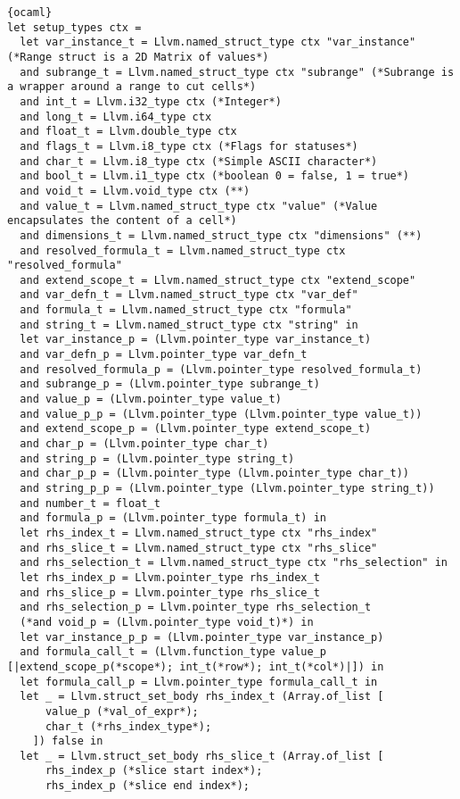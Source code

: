 \begin{lstlisting}{ocaml}
let setup_types ctx =
  let var_instance_t = Llvm.named_struct_type ctx "var_instance" (*Range struct is a 2D Matrix of values*)
  and subrange_t = Llvm.named_struct_type ctx "subrange" (*Subrange is a wrapper around a range to cut cells*)
  and int_t = Llvm.i32_type ctx (*Integer*)
  and long_t = Llvm.i64_type ctx
  and float_t = Llvm.double_type ctx
  and flags_t = Llvm.i8_type ctx (*Flags for statuses*)
  and char_t = Llvm.i8_type ctx (*Simple ASCII character*)
  and bool_t = Llvm.i1_type ctx (*boolean 0 = false, 1 = true*)
  and void_t = Llvm.void_type ctx (**)
  and value_t = Llvm.named_struct_type ctx "value" (*Value encapsulates the content of a cell*)
  and dimensions_t = Llvm.named_struct_type ctx "dimensions" (**)
  and resolved_formula_t = Llvm.named_struct_type ctx "resolved_formula"
  and extend_scope_t = Llvm.named_struct_type ctx "extend_scope"
  and var_defn_t = Llvm.named_struct_type ctx "var_def"
  and formula_t = Llvm.named_struct_type ctx "formula"
  and string_t = Llvm.named_struct_type ctx "string" in
  let var_instance_p = (Llvm.pointer_type var_instance_t)
  and var_defn_p = Llvm.pointer_type var_defn_t
  and resolved_formula_p = (Llvm.pointer_type resolved_formula_t)
  and subrange_p = (Llvm.pointer_type subrange_t)
  and value_p = (Llvm.pointer_type value_t)
  and value_p_p = (Llvm.pointer_type (Llvm.pointer_type value_t))
  and extend_scope_p = (Llvm.pointer_type extend_scope_t)
  and char_p = (Llvm.pointer_type char_t)
  and string_p = (Llvm.pointer_type string_t)
  and char_p_p = (Llvm.pointer_type (Llvm.pointer_type char_t))
  and string_p_p = (Llvm.pointer_type (Llvm.pointer_type string_t))
  and number_t = float_t
  and formula_p = (Llvm.pointer_type formula_t) in
  let rhs_index_t = Llvm.named_struct_type ctx "rhs_index"
  and rhs_slice_t = Llvm.named_struct_type ctx "rhs_slice"
  and rhs_selection_t = Llvm.named_struct_type ctx "rhs_selection" in
  let rhs_index_p = Llvm.pointer_type rhs_index_t
  and rhs_slice_p = Llvm.pointer_type rhs_slice_t
  and rhs_selection_p = Llvm.pointer_type rhs_selection_t
  (*and void_p = (Llvm.pointer_type void_t)*) in
  let var_instance_p_p = (Llvm.pointer_type var_instance_p)
  and formula_call_t = (Llvm.function_type value_p [|extend_scope_p(*scope*); int_t(*row*); int_t(*col*)|]) in
  let formula_call_p = Llvm.pointer_type formula_call_t in
  let _ = Llvm.struct_set_body rhs_index_t (Array.of_list [
      value_p (*val_of_expr*);
      char_t (*rhs_index_type*);
    ]) false in
  let _ = Llvm.struct_set_body rhs_slice_t (Array.of_list [
      rhs_index_p (*slice start index*);
      rhs_index_p (*slice end index*);

\end{lstlisting}
